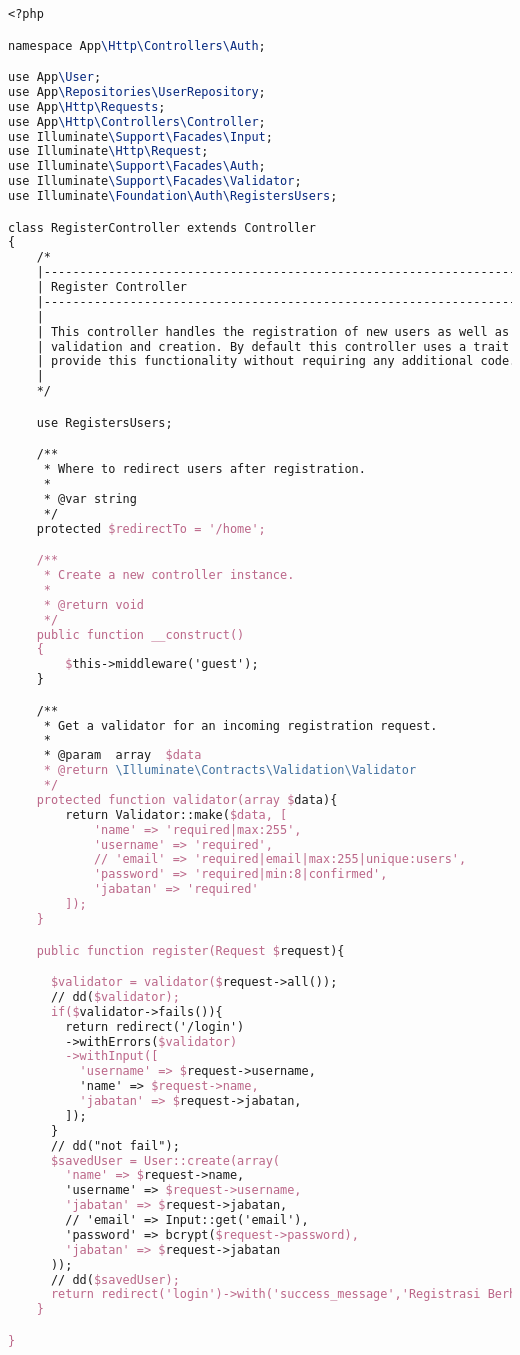 \begin{lstlisting}[language=tex,basicstyle=\tiny,caption=AuthController.php]
<?php

namespace App\Http\Controllers\Auth;

use App\User;
use App\Repositories\UserRepository;
use App\Http\Requests;
use App\Http\Controllers\Controller;
use Illuminate\Support\Facades\Input;
use Illuminate\Http\Request;
use Illuminate\Support\Facades\Auth;
use Illuminate\Support\Facades\Validator;
use Illuminate\Foundation\Auth\RegistersUsers;

class RegisterController extends Controller
{
    /*
    |--------------------------------------------------------------------------
    | Register Controller
    |--------------------------------------------------------------------------
    |
    | This controller handles the registration of new users as well as their
    | validation and creation. By default this controller uses a trait to
    | provide this functionality without requiring any additional code.
    |
    */

    use RegistersUsers;

    /**
     * Where to redirect users after registration.
     *
     * @var string
     */
    protected $redirectTo = '/home';

    /**
     * Create a new controller instance.
     *
     * @return void
     */
    public function __construct()
    {
        $this->middleware('guest');
    }

    /**
     * Get a validator for an incoming registration request.
     *
     * @param  array  $data
     * @return \Illuminate\Contracts\Validation\Validator
     */
    protected function validator(array $data){
        return Validator::make($data, [
            'name' => 'required|max:255',
            'username' => 'required',
            // 'email' => 'required|email|max:255|unique:users',
            'password' => 'required|min:8|confirmed',
            'jabatan' => 'required'
        ]);
    }

    public function register(Request $request){

      $validator = validator($request->all());
      // dd($validator);
      if($validator->fails()){
        return redirect('/login')
        ->withErrors($validator)
        ->withInput([
          'username' => $request->username,
          'name' => $request->name,
          'jabatan' => $request->jabatan,
        ]);
      }
      // dd("not fail");
      $savedUser = User::create(array(
        'name' => $request->name,
        'username' => $request->username,
        'jabatan' => $request->jabatan,
        // 'email' => Input::get('email'),
        'password' => bcrypt($request->password),
        'jabatan' => $request->jabatan
      ));
      // dd($savedUser);
      return redirect('login')->with('success_message','Registrasi Berhasil');
    }

}
\end{lstlisting}

